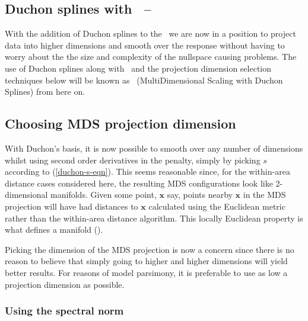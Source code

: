 

\subsection{Duchon splines with \mdsap\ -- \mdsds}

With the addition of Duchon splines to the \mdsap\ we are now in a position to project data into higher dimensions and smooth over the response without having to worry about the the size and complexity of the nullspace causing problems. The use of Duchon splines along with \mdsap\ and the projection dimension selection techniques below will be known as \mdsds\ (MultiDimensional Scaling with Duchon Splines) from here on.

\subsection{Choosing MDS projection dimension}
\label{gds-dimselect}

With Duchon's basis, it is now possible to smooth over any number of dimensions whilst using second order derivatives in the penalty, simply by picking $s$ according to (\ref{duchon-s-eqn}). This seems reasonable since, for the within-area distance cases considered here, the resulting MDS configurations look like 2-dimensional manifolds. Given some point, $\mathbf{x}$ say, points nearby $\mathbf{x}$ in the MDS projection will have had distances to $\mathbf{x}$ calculated using the Euclidean metric rather than the within-area distance algorithm. This locally Euclidean property is what defines a manifold (\cite[p. 225]{topology}).

Picking the dimension of the MDS projection is now a concern since there is no reason to believe that simply going to higher and higher dimensions will yield better results. For reasons of model parsimony, it is preferable to use as low a projection dimension as possible.

\subsubsection{Using the spectral norm}

